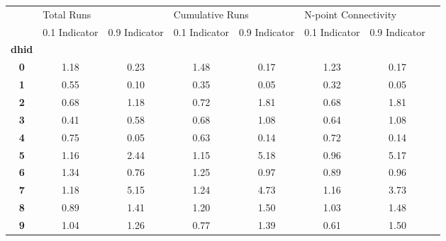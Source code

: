 \begin{tabular}{cccccccc}
\toprule
{} & \multicolumn{2}{l}{Total Runs} & \multicolumn{2}{l}{Cumulative Runs} & \multicolumn{2}{l}{N-point Connectivity} \\
{} & 0.1 Indicator & 0.9 Indicator &   0.1 Indicator & 0.9 Indicator &        0.1 Indicator & 0.9 Indicator \\
\textbf{dhid} &               &               &                 &               &                      &               \\
\midrule
\textbf{0   } &          1.18 &          0.23 &            1.48 &          0.17 &                 1.23 &          0.17 \\
\textbf{1   } &          0.55 &          0.10 &            0.35 &          0.05 &                 0.32 &          0.05 \\
\textbf{2   } &          0.68 &          1.18 &            0.72 &          1.81 &                 0.68 &          1.81 \\
\textbf{3   } &          0.41 &          0.58 &            0.68 &          1.08 &                 0.64 &          1.08 \\
\textbf{4   } &          0.75 &          0.05 &            0.63 &          0.14 &                 0.72 &          0.14 \\
\textbf{5   } &          1.16 &          2.44 &            1.15 &          5.18 &                 0.96 &          5.17 \\
\textbf{6   } &          1.34 &          0.76 &            1.25 &          0.97 &                 0.89 &          0.96 \\
\textbf{7   } &          1.18 &          5.15 &            1.24 &          4.73 &                 1.16 &          3.73 \\
\textbf{8   } &          0.89 &          1.41 &            1.20 &          1.50 &                 1.03 &          1.48 \\
\textbf{9   } &          1.04 &          1.26 &            0.77 &          1.39 &                 0.61 &          1.50 \\
\bottomrule
\end{tabular}
